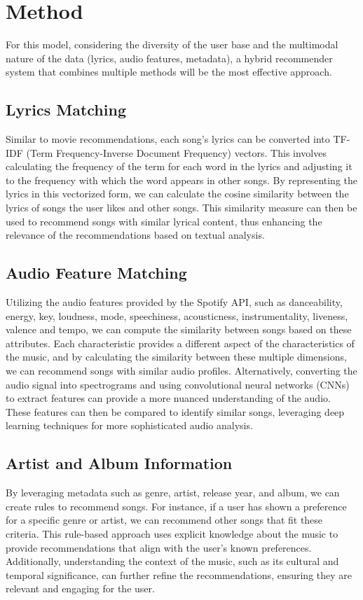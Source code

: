 \documentclass[9pt,twocolumn,twoside,lineno]{gsajnl}
\begin{document}
\section{Method}
For this model, considering the diversity of the user base and the multimodal nature of the data (lyrics, audio features, metadata), a hybrid recommender system that combines multiple methods will be the most effective approach.
\subsection{Lyrics Matching}
Similar to movie recommendations, each song’s lyrics can be converted into TF-IDF (Term Frequency-Inverse Document Frequency) vectors. This involves calculating the frequency of the term for each word in the lyrics and adjusting it to the frequency with which the word appears in other songs. By representing the lyrics in this vectorized form, we can calculate the cosine similarity between the lyrics of songs the user likes and other songs. This similarity measure can then be used to recommend songs with similar lyrical content, thus enhancing the relevance of the recommendations based on textual analysis.

\subsection{Audio Feature Matching}
Utilizing the audio features provided by the Spotify API, such as danceability, energy, key, loudness, mode, speechiness, acousticness, instrumentality, liveness, valence and tempo, we can compute the similarity between songs based on these attributes. Each characteristic provides a different aspect of the characteristics of the music, and by calculating the similarity between these multiple dimensions, we can recommend songs with similar audio profiles. Alternatively, converting the audio signal into spectrograms and using convolutional neural networks (CNNs) to extract features can provide a more nuanced understanding of the audio. These features can then be compared to identify similar songs, leveraging deep learning techniques for more sophisticated audio analysis.

\subsection{Artist and Album Information}
By leveraging metadata such as genre, artist, release year, and album, we can create rules to recommend songs. For instance, if a user has shown a preference for a specific genre or artist, we can recommend other songs that fit these criteria. This rule-based approach uses explicit knowledge about the music to provide recommendations that align with the user’s known preferences. Additionally, understanding the context of the music, such as its cultural and temporal significance, can further refine the recommendations, ensuring they are relevant and engaging for the user.
\end{document}
